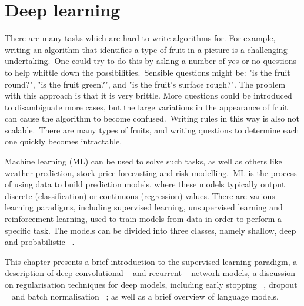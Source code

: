 
\chapter{Deep learning}

\ifpdf
     \graphicspath{{Figs/Chapter2/}}
\else
    \graphicspath{{Chapter2/Figs/Vector/}{Chapter2/Figs/}}
\fi


There are many tasks which are hard to write algorithms for. For example, writing an algorithm that identifies a type of fruit in a picture is a challenging undertaking.\ One could try to do this by asking a number of yes or no questions to help whittle down the possibilities.\ Sensible questions might be: "is the fruit round?", "is the fruit green?", and "is the fruit's surface rough?". The problem with this approach is that it is very brittle. More questions could be introduced to disambiguate more cases, but the large variations in the appearance of fruit can cause the algorithm to become confused.\ Writing rules in this way is also not scalable.\ There are many types of fruits, and writing questions to determine each one quickly becomes intractable. \par
 
\noindent Machine learning (ML) can be used to solve such tasks, as well as others like weather prediction, stock price forecasting and risk modelling.\ ML is the process of using data to build prediction models, where these models typically output discrete (classification) or continuous (regression) values. There are various learning paradigms, including supervised learning, unsupervised learning and reinforcement learning, used to train models from data in order to perform a specific task. The models can be divided into three classes, namely shallow, deep and probabilistic \unskip ~\citep{hastie2009elements}. \par

\noindent This chapter presents a brief introduction to the supervised learning paradigm, a description of deep convolutional \unskip ~\citep{lecun1998gradient} and recurrent \unskip ~\citep{werbos1988generalization} network models, a discussion on regularisation techniques for deep models, including early stopping \unskip~\citep{prechelt1998early}, dropout \unskip ~\citep{srivastava2014dropout} and batch normalisation \unskip ~\citep{ioffe2015batch}; as well as a brief overview of language models. 


